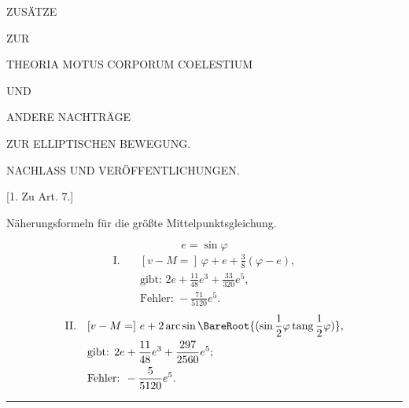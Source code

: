 \clearpage
\thispagestyle{empty}
\vspace*{1.6in}
\begin{center}
{\LARGE ZUSÄTZE\par}
\bigskip
{\large ZUR\par}
\bigskip
{\large THEORIA MOTUS CORPORUM COELESTIUM\par}
\bigskip
{\large UND\par}
\bigskip
{\Large ANDERE NACHTRÄGE\par}
\medskip
{\large ZUR ELLIPTISCHEN BEWEGUNG.\par}
\end{center}
\clearpage
{}
\begin{center}
{\large NACHLASS UND VERÖFFENTLICHUNGEN.\par}
\bigskip
{}[1. Zu Art. 7.]
\medskip

Näherungsformeln für die größte Mittelpunktsgleichung.
\end{center}
\[
e=\sin\varphi
\]
\[
\begin{aligned}
\mathrm{I.}\quad &[v-M=]\ \varphi+e+\frac{3}{8}(\varphi-e),\\
&\text{gibt: }2e+\frac{11}{48}e^3+\frac{33}{320}e^5,\\
&\text{Fehler: }-\frac{71}{5120}e^5.
\end{aligned}
\]
\[
\begin{aligned}
\mathrm{II.}\quad &[v-M=]\ e+2\operatorname{arc}\sin\BareRoot{(\sin\frac{1}{2}\varphi\operatorname{tang}\frac{1}{2}\varphi)},\\
&\text{gibt: }2e+\frac{11}{48}e^3+\frac{297}{2560}e^5;\\
&\text{Fehler: }-\frac{5}{5120}e^5.
\end{aligned}
\]
\begin{center}\rule{.3\linewidth}{.4pt}\end{center}
